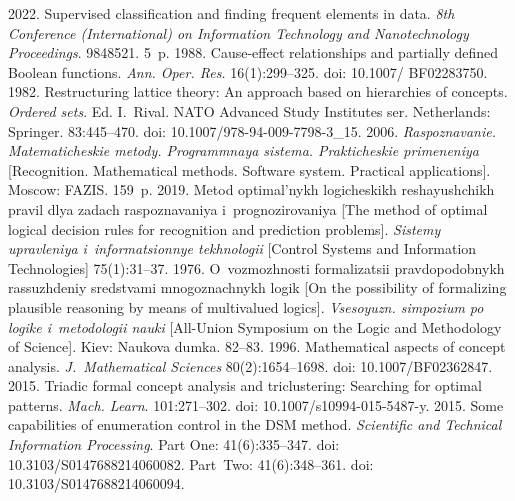 \begin{multicols}{2}
{{\begin{thebibliography}{99}
 2022. Supervised classification and 
finding frequent elements in data. \textit{8th Conference (International) on Information 
Technology and Nanotechnology Proceedings}. 9848521. 5~p.
 1988. Cause-effect relationships and partially 
defined Boolean functions. \textit{Ann. Oper. Res.} 16(1):299--325. doi: 10.1007/ BF02283750.
 1982. Restructuring lattice theory: An approach based on hierarchies of concepts. 
\textit{Ordered sets}. Ed. I.~Rival. NATO Advanced Study Institutes ser. Netherlands: Springer. 
83:445--470. doi: 10.1007/978-94-009-7798-3\_15.
 2006. \textit{Ras\-po\-zna\-va\-nie.  
Ma\-te\-ma\-ti\-che\-skie me\-to\-dy. Programmnaya sis\-te\-ma. Prak\-ti\-che\-skie  
pri\-me\-ne\-niya} [Recognition. Mathematical methods. Software system. Practical 
applications]. Moscow: FAZIS. 159~p.
 2019. Me\-tod op\-ti\-mal'\-nykh lo\-gi\-che\-skikh re\-sha\-yushchikh pra\-vil 
dlya za\-dach ras\-po\-zna\-va\-niya i~prog\-no\-zi\-ro\-va\-niya [The method of optimal logical 
decision rules for recognition and prediction problems]. \textit{Sistemy upravleniya 
i~informatsionnye tekhnologii} [Control Systems and Information Technologies] 75(1):31--37.
 1976. O~voz\-mozh\-nosti for\-ma\-li\-za\-tsii prav\-do\-po\-dob\-nykh  
ras\-suzh\-de\-niy sred\-st\-va\-mi mno\-go\-znach\-nykh lo\-gik [On the possibility of 
formalizing plausible reasoning by means of multivalued logics]. \textit{Vsesoyuzn. simpozium 
po logike i~metodologii nauki} [All-Union Symposium on the Logic and Methodology of 
Science]. Kiev: Naukova dumka. 82--83.
 1996. Mathematical aspects of concept analysis. \textit{J.~Mathematical Sciences} 
80(2):1654--1698. doi: 10.1007/BF02362847.
 2015. Triadic 
formal concept analysis and triclustering: Searching for optimal patterns. \textit{Mach. Learn}. 
101:271--302. doi: 10.1007/s10994-015-5487-y.
 2015. Some capabilities of enumeration control in the DSM method. 
\textit{Scientific and Technical Information Processing}. Part One: 41(6):335--347. doi: 
10.3103/S0147688214060082. Part~Two: 41(6):348--361. doi: 10.3103/S0147688214060094.

\end{thebibliography}}}
\end{multicols}
